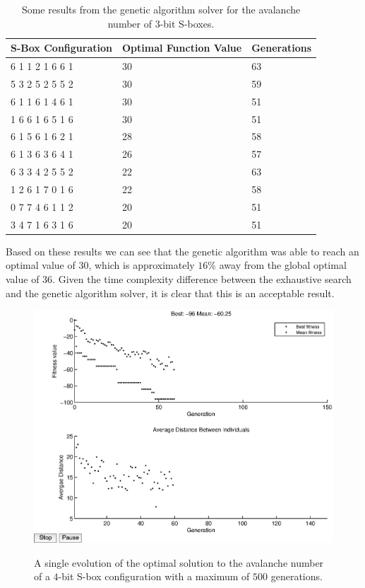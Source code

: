 \documentclass[11pt]{article}
\begin{document}
\begin{table}
	\centering
	\label{avTable}
	\caption{Some results from the genetic algorithm solver for the avalanche number of $3$-bit S-boxes.}
    \begin{tabular}{|l|l|l|}
        \hline
        S-Box Configuration & Optimal Function Value & Generations \\ \hline
        6     1     1     2     1     6     6     1 & 30 & 63 \\
        5     3     2     5     2     5     5     2 & 30 & 59 \\ 
        6     1     1     6     1     4     6     1 & 30 & 51 \\ 
        1     6     6     1     6     5     1     6 & 30 & 51 \\ 
        6     1     5     6     1     6     2     1 & 28 & 58 \\ 
        6     1     3     6     3     6     4     1 & 26 & 57 \\ 
	6     3     3     4     2     5     5     2 & 22 & 63 \\ 
        1     2     6     1     7     0     1     6 & 22 & 58 \\ 
        0     7     7     4     6     1     1     2 & 20 & 51 \\ 
        3     4     7     1     6     3     1     6 & 20 & 51 \\ 
        \hline
    \end{tabular}
\end{table}

Based on these results we can see that the genetic algorithm was able to reach an optimal value of $30$, which is approximately $16\%$ away from the global optimal value of $36$. Given the time complexity difference between the exhaustive search and the genetic algorithm solver, it is clear that this is an acceptable result. 

\begin{figure}
\centering
	\includegraphics[scale=0.5]{images/avalanche_results16.eps} \\
	\label{av16}
	\caption{A single evolution of the optimal solution to the avalanche number of a $4$-bit S-box configuration with a maximum of $500$ generations.}
\end{figure}
\end{document}
